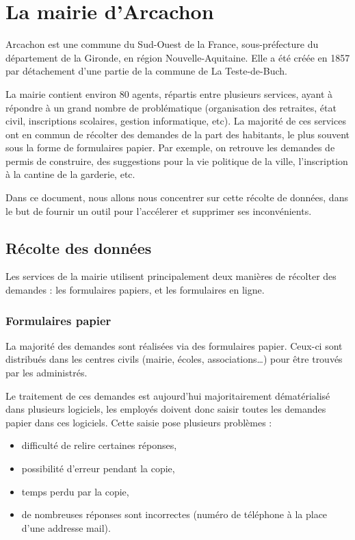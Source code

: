 \section{La mairie d'Arcachon}\label{sec:la-mairie-d'arcachon}

Arcachon est une commune du Sud-Ouest de la France, sous-préfecture du département de la Gironde, en région Nouvelle-Aquitaine.
Elle a été créée en 1857 par détachement d'une partie de la commune de La Teste-de-Buch.

La mairie contient environ 80 agents, répartis entre plusieurs services, ayant à répondre à un grand nombre de problématique (organisation des retraites, état civil, inscriptions scolaires, gestion informatique, etc).
La majorité de ces services ont en commun de récolter des demandes de la part des habitants, le plus souvent sous la forme de formulaires papier.
Par exemple, on retrouve les demandes de permis de construire, des suggestions pour la vie politique de la ville, l'inscription à la cantine de la garderie, etc.

Dans ce document, nous allons nous concentrer sur cette récolte de données, dans le but de fournir un outil pour l'accélerer et supprimer ses inconvénients.

\subsection{Récolte des données}\label{subsec:recolte-des-donnees}

Les services de la mairie utilisent principalement deux manières de récolter des demandes : les formulaires papiers, et les formulaires en ligne.

\subsubsection{Formulaires papier}

La majorité des demandes sont réalisées via des formulaires papier.
Ceux-ci sont distribués dans les centres civils (mairie, écoles, associations…) pour être trouvés par les administrés.

Le traitement de ces demandes est aujourd'hui majoritairement dématérialisé dans plusieurs logiciels,
les employés doivent donc saisir toutes les demandes papier dans ces logiciels.
Cette saisie pose plusieurs problèmes :
\begin{itemize}
	\item difficulté de relire certaines réponses,
	\item possibilité d'erreur pendant la copie,
	\item temps perdu par la copie,
	\item de nombreuses réponses sont incorrectes (numéro de téléphone à la place d'une addresse mail).
\end{itemize}

